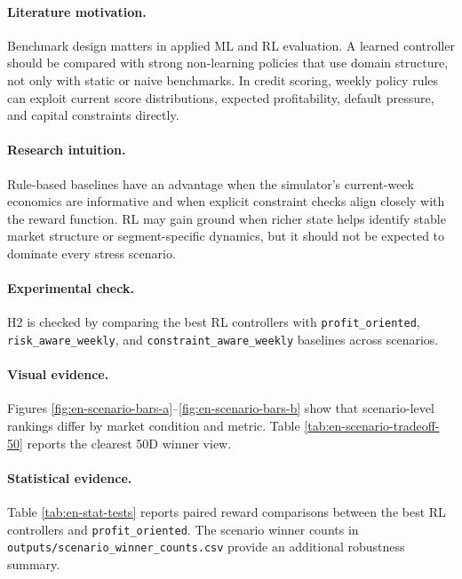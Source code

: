\documentclass[12pt,a4paper]{article}
\begin{document}
\paragraph{Literature motivation.}
Benchmark design matters in applied ML and RL evaluation. A learned controller should be compared with strong non-learning policies that use domain structure, not only with static or naive benchmarks. In credit scoring, weekly policy rules can exploit current score distributions, expected profitability, default pressure, and capital constraints directly.

\paragraph{Research intuition.}
Rule-based baselines have an advantage when the simulator's current-week economics are informative and when explicit constraint checks align closely with the reward function. RL may gain ground when richer state helps identify stable market structure or segment-specific dynamics, but it should not be expected to dominate every stress scenario.

\paragraph{Experimental check.}
H2 is checked by comparing the best RL controllers with \texttt{profit\_oriented}, \texttt{risk\_aware\_weekly}, and \texttt{constraint\_aware\_weekly} baselines across scenarios.

\paragraph{Visual evidence.}
Figures \ref{fig:en-scenario-bars-a}--\ref{fig:en-scenario-bars-b} show that scenario-level rankings differ by market condition and metric. Table \ref{tab:en-scenario-tradeoff-50} reports the clearest 50D winner view.

\paragraph{Statistical evidence.}
Table \ref{tab:en-stat-tests} reports paired reward comparisons between the best RL controllers and \texttt{profit\_oriented}. The scenario winner counts in \texttt{outputs/scenario\_winner\_counts.csv} provide an additional robustness summary.
\end{document}
